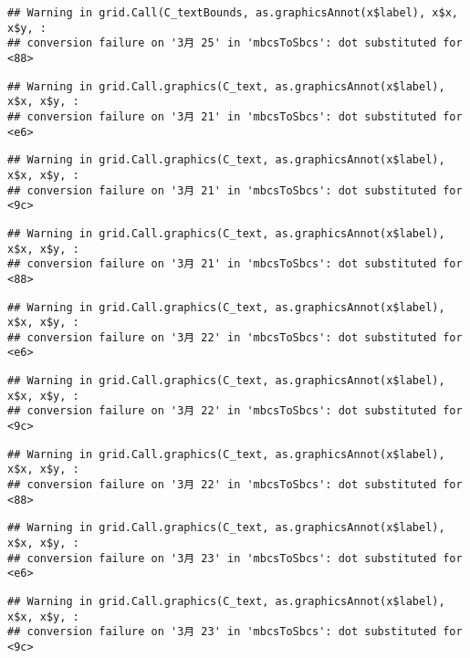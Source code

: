 \documentclass[
]{article}
\begin{document}
\begin{verbatim}
## Warning in grid.Call(C_textBounds, as.graphicsAnnot(x$label), x$x, x$y, :
## conversion failure on '3月 25' in 'mbcsToSbcs': dot substituted for <88>
\end{verbatim}

\begin{verbatim}
## Warning in grid.Call.graphics(C_text, as.graphicsAnnot(x$label), x$x, x$y, :
## conversion failure on '3月 21' in 'mbcsToSbcs': dot substituted for <e6>
\end{verbatim}

\begin{verbatim}
## Warning in grid.Call.graphics(C_text, as.graphicsAnnot(x$label), x$x, x$y, :
## conversion failure on '3月 21' in 'mbcsToSbcs': dot substituted for <9c>
\end{verbatim}

\begin{verbatim}
## Warning in grid.Call.graphics(C_text, as.graphicsAnnot(x$label), x$x, x$y, :
## conversion failure on '3月 21' in 'mbcsToSbcs': dot substituted for <88>
\end{verbatim}

\begin{verbatim}
## Warning in grid.Call.graphics(C_text, as.graphicsAnnot(x$label), x$x, x$y, :
## conversion failure on '3月 22' in 'mbcsToSbcs': dot substituted for <e6>
\end{verbatim}

\begin{verbatim}
## Warning in grid.Call.graphics(C_text, as.graphicsAnnot(x$label), x$x, x$y, :
## conversion failure on '3月 22' in 'mbcsToSbcs': dot substituted for <9c>
\end{verbatim}

\begin{verbatim}
## Warning in grid.Call.graphics(C_text, as.graphicsAnnot(x$label), x$x, x$y, :
## conversion failure on '3月 22' in 'mbcsToSbcs': dot substituted for <88>
\end{verbatim}

\begin{verbatim}
## Warning in grid.Call.graphics(C_text, as.graphicsAnnot(x$label), x$x, x$y, :
## conversion failure on '3月 23' in 'mbcsToSbcs': dot substituted for <e6>
\end{verbatim}

\begin{verbatim}
## Warning in grid.Call.graphics(C_text, as.graphicsAnnot(x$label), x$x, x$y, :
## conversion failure on '3月 23' in 'mbcsToSbcs': dot substituted for <9c>
\end{verbatim}
\end{document}
